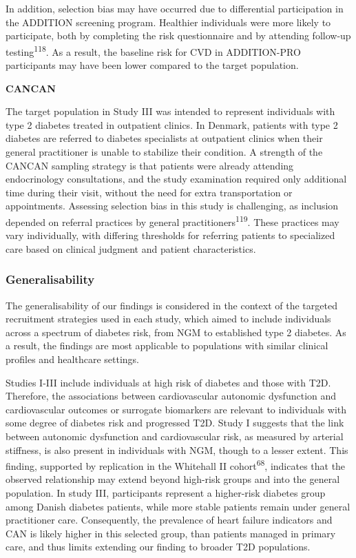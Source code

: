\documentclass[
  a4paper,
  headsepline=true,
  open=any]{scrbook}
\begin{document}
In addition, selection bias may have occurred due to differential
participation in the ADDITION screening program. Healthier individuals
were more likely to participate, both by completing the risk
questionnaire and by attending follow-up testing\textsuperscript{118}.
As a result, the baseline risk for CVD in ADDITION-PRO participants may
have been lower compared to the target population.

\textbf{CANCAN}

The target population in Study III was intended to represent individuals
with type 2 diabetes treated in outpatient clinics. In Denmark, patients
with type 2 diabetes are referred to diabetes specialists at outpatient
clinics when their general practitioner is unable to stabilize their
condition. A strength of the CANCAN sampling strategy is that patients
were already attending endocrinology consultations, and the study
examination required only additional time during their visit, without
the need for extra transportation or appointments. Assessing selection
bias in this study is challenging, as inclusion depended on referral
practices by general practitioners\textsuperscript{119}. These practices
may vary individually, with differing thresholds for referring patients
to specialized care based on clinical judgment and patient
characteristics.

\hypertarget{generalisability}{%
\subsubsection{Generalisability}\label{generalisability}}

The generalisability of our findings is considered in the context of the
targeted recruitment strategies used in each study, which aimed to
include individuals across a spectrum of diabetes risk, from NGM to
established type 2 diabetes. As a result, the findings are most
applicable to populations with similar clinical profiles and healthcare
settings.

Studies I-III include individuals at high risk of diabetes and those
with T2D. Therefore, the associations between cardiovascular autonomic
dysfunction and cardiovascular outcomes or surrogate biomarkers are
relevant to individuals with some degree of diabetes risk and progressed
T2D. Study I suggests that the link between autonomic dysfunction and
cardiovascular risk, as measured by arterial stiffness, is also present
in individuals with NGM, though to a lesser extent. This finding,
supported by replication in the Whitehall II cohort\textsuperscript{68},
indicates that the observed relationship may extend beyond high-risk
groups and into the general population. In study III, participants
represent a higher-risk diabetes group among Danish diabetes patients,
while more stable patients remain under general practitioner care.
Consequently, the prevalence of heart failure indicators and CAN is
likely higher in this selected group, than patients managed in primary
care, and thus limits extending our finding to broader T2D populations.
\end{document}
